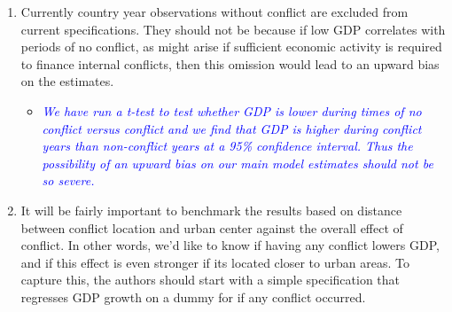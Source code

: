\begin{enumerate}
\item Currently country year observations without conflict are excluded from current specifications. They should not be because if low GDP correlates with periods of no conflict, as might arise if sufficient economic activity is required to finance internal conflicts, then this omission would lead to an upward bias on the estimates.

\begin{itemize}
\item \textcolor{blue}{\emph{
	We have run a t-test to test whether GDP is lower during times of no conflict versus conflict and we find that GDP is higher during conflict years than non-conflict years at a 95\% confidence interval. Thus the possibility of an upward bias on our main model estimates should not be so severe. 
}}
\end{itemize}

\item It will be fairly important to benchmark the results based on distance between conflict location and urban center against the overall effect of conflict. In other words, we’d like to know if having any conflict lowers GDP, and if this effect is even stronger if its located closer to urban areas. To capture this, the authors should start with a simple specification that regresses GDP growth on a dummy for if any conflict occurred. 


\end{enumerate}
